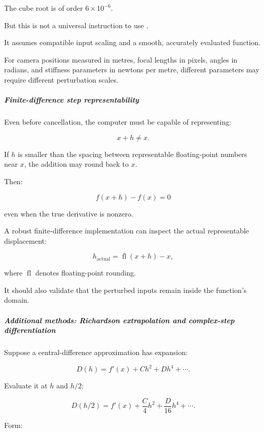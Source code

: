 The cube root is of order \(6\times10^{-6}\).

But this is not a universal instruction to use .

It assumes compatible input scaling and a smooth, accurately evaluated function.

For camera positions measured in metres, focal lengths in pixels, angles in radians, and stiffness parameters in newtons per metre, different parameters may require different perturbation scales.

\subparagraph{Finite-difference step representability}\label{02-foundations-ii-ch025-finite-difference-step-representability}

\hypertarget{02-foundations-ii-ch025-finite-difference-step-representability}{}

Even before cancellation, the computer must be capable of representing:

\[
x+h\ne x.
\]

If \(h\) is smaller than the spacing between representable floating-point numbers near \(x\), the addition may round back to \(x\).

Then:

\[
f(x+h)-f(x)=0
\]

even when the true derivative is nonzero.

A robust finite-difference implementation can inspect the actual representable displacement:

\[
h_{\mathrm{actual}}=\operatorname{fl}(x+h)-x,
\]

where \(\operatorname{fl}\) denotes floating-point rounding.

It should also validate that the perturbed inputs remain inside the function's domain.

\subparagraph{Additional methods: Richardson extrapolation and complex-step differentiation}\label{02-foundations-ii-ch025-additional-methods-richardson-extrapolation-and-complex-step-differentiation}

\hypertarget{02-foundations-ii-ch025-additional-methods-richardson-extrapolation-and-complex-step-differentiation}{}

Suppose a central-difference approximation has expansion:

\[
D(h)=f'(x)+Ch^2+Dh^4+\cdots.
\]

Evaluate it at \(h\) and \(h/2\):

\[
D(h/2)=f'(x)+\frac C4h^2+\frac D{16}h^4+\cdots.
\]

Form:

